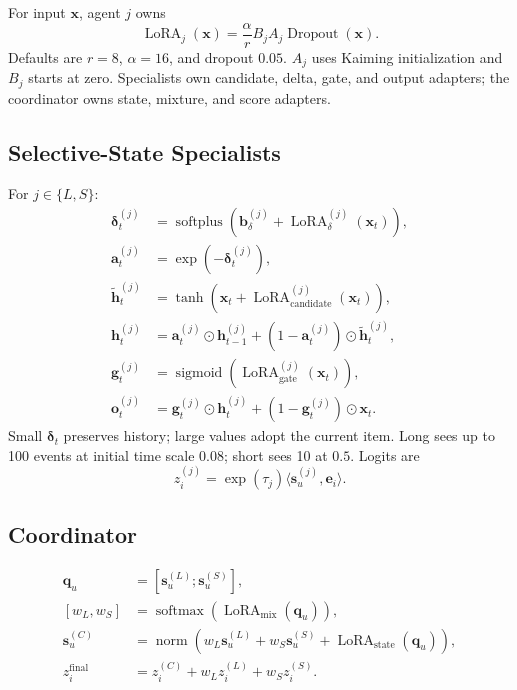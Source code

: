 \documentclass[11pt,a4paper]{article}
\newcommand{\softmax}{\operatorname{softmax}}
\newcommand{\sigmoid}{\operatorname{sigmoid}}
\begin{document}
For input $\bm x$, agent $j$ owns
\begin{equation}
  \operatorname{LoRA}_j(\bm x)
  =
  \frac{\alpha}{r}B_jA_j\operatorname{Dropout}(\bm x).
\end{equation}
Defaults are $r=8$, $\alpha=16$, and dropout $0.05$. $A_j$ uses Kaiming initialization and $B_j$ starts at zero. Specialists own candidate, delta, gate, and output adapters; the coordinator owns state, mixture, and score adapters.

\subsection{Selective-State Specialists}

For $j\in\{L,S\}$:
\begin{align}
  \bm\delta_t^{(j)}
  &=
  \operatorname{softplus}
  \left(\bm b_\delta^{(j)}+\operatorname{LoRA}^{(j)}_\delta(\bm x_t)\right),\\
  \bm a_t^{(j)}&=\exp(-\bm\delta_t^{(j)}),\\
  \widetilde{\bm h}_t^{(j)}
  &=
  \tanh\left(\bm x_t+\operatorname{LoRA}^{(j)}_{\mathrm{candidate}}(\bm x_t)\right),\\
  \bm h_t^{(j)}
  &=
  \bm a_t^{(j)}\odot\bm h_{t-1}^{(j)}
  +(1-\bm a_t^{(j)})\odot\widetilde{\bm h}_t^{(j)},\\
  \bm g_t^{(j)}
  &=
  \sigmoid\left(\operatorname{LoRA}^{(j)}_{\mathrm{gate}}(\bm x_t)\right),\\
  \bm o_t^{(j)}
  &=
  \bm g_t^{(j)}\odot\bm h_t^{(j)}
  +(1-\bm g_t^{(j)})\odot\bm x_t.
\end{align}
Small $\bm\delta_t$ preserves history; large values adopt the current item. Long sees up to 100 events at initial time scale $0.08$; short sees 10 at $0.5$. Logits are
\begin{equation}
  z_i^{(j)}=\exp(\tau_j)\langle\bm s_u^{(j)},\bm e_i\rangle.
\end{equation}

\subsection{Coordinator}

\begin{align}
  \bm q_u&=[\bm s_u^{(L)};\bm s_u^{(S)}],\\
  [w_L,w_S]&=\softmax(\operatorname{LoRA}_{\mathrm{mix}}(\bm q_u)),\\
  \bm s_u^{(C)}
  &=
  \operatorname{norm}\left(
  w_L\bm s_u^{(L)}+w_S\bm s_u^{(S)}
  +\operatorname{LoRA}_{\mathrm{state}}(\bm q_u)\right),\\
  z_i^{\mathrm{final}}&=z_i^{(C)}+w_Lz_i^{(L)}+w_Sz_i^{(S)}.
\end{align}
\end{document}

